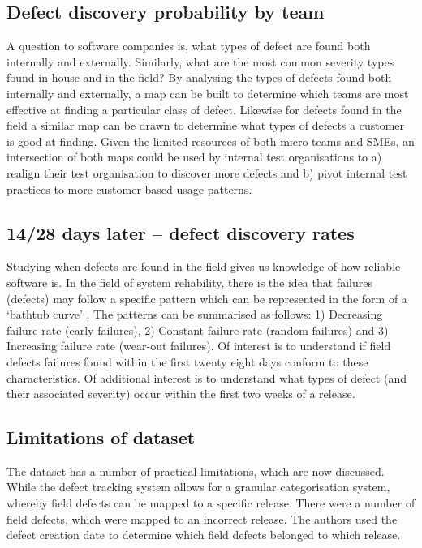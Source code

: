 \subsection{Defect discovery probability by team}

A question to software companies is, what types of defect are found both internally and externally. Similarly, what are the most common severity types found in-house and in the field? By analysing the types of defects found both internally and externally, a map can be built to determine which teams are most effective at finding a particular class of defect. Likewise for defects found in the field a similar map can be drawn to determine what types of defects a customer is good at finding. Given the limited resources of both micro teams and SMEs, an intersection of both maps could be used by internal test organisations to a) realign their test organisation to discover more defects and b) pivot internal test practices to more customer based usage patterns. \par

\subsection{14/28 days later -- defect discovery rates}

Studying when defects are found in the field gives us knowledge of how reliable software is. In the field of system
reliability, there is the idea that failures (defects) may follow a specific pattern which can be represented in the form of a `bathtub curve' \cite{klutke2003critical} \cite{wikipediabathtub}. The patterns can be summarised as follows: 1) Decreasing failure rate (early failures), 2) Constant failure rate (random failures) and 3) Increasing failure rate (wear-out failures). Of interest is to understand if field defects failures found within the first twenty eight days conform to
these characteristics. Of additional interest is to understand what types of defect (and their associated severity) occur
within the first two weeks of a release. \par

\subsection{Limitations of dataset}

The dataset has a number of practical limitations, which are now discussed. While the defect tracking system allows
for a granular categorisation system, whereby field defects can be mapped to a specific release. There were a number of field defects, which were mapped to an incorrect release. The authors used the defect creation date to determine which field defects belonged to which release. \par

